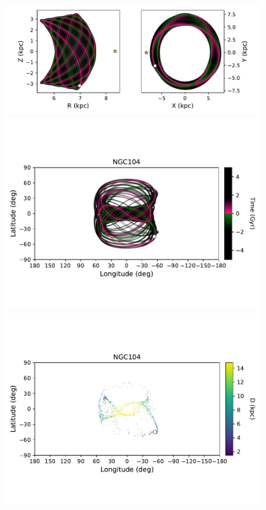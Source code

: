             \twocolumn
            \begin{figure}
                \begin{center}
                    \includegraphics[clip=true, trim = 0mm 2mm 0mm 0mm, width=0.9\columnwidth]{images/PII_individual_NGC104_NGC104orbitRZXY.pdf}
                    \includegraphics[clip=true, trim = 0mm 20mm 0mm 10mm, width=0.9\columnwidth]{images/PII_individual_NGC104_NGC104orbit.pdf}
                    \includegraphics[clip=true, trim = 0mm 20mm 0mm 10mm, width=0.9\columnwidth]{images/PII_individual_NGC104_NGC104_LB_D.pdf}

\end{center}
\end{figure}
